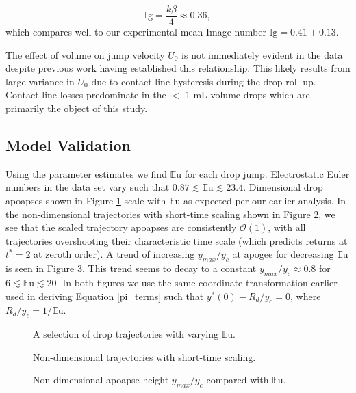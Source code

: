 \documentclass[aip,reprint, floatfix]{revtex4-1}
\begin{document}
\begin{equation*}
\mathbb{I}\mbox{g} = \frac{k \beta}{4} \approx 0.36,
\end{equation*}
which compares well to our experimental mean Image number $\mathbb{I}\mbox{g} = 0.41 \pm 0.13$.

The effect of volume on jump velocity $U_0$ is not immediately evident in the data despite previous work having established this relationship. \cite{attari_puddle_2016} This likely results from large variance in $U_0$ due to contact line hysteresis during the drop roll-up. Contact line losses predominate in the $<$ 1 mL volume drops which are primarily the object of this study.  

\subsection{Model Validation}
Using the parameter estimates we find $\mathbb{E}\mbox{u}$ for each drop jump. Electrostatic Euler numbers in the data set vary such that $0.87 \lesssim \mathbb{E}\mbox{u} \lesssim 23.4$. Dimensional drop apoapses shown in Figure \ref{fig:series_s_eu} scale with $\mathbb{E}\mbox{u}$ as expected per our earlier analysis. In the non-dimensional trajectories with short-time scaling shown in Figure \ref{fig:series_s_ds}, we see that the scaled trajectory apoapses are consistently $\mathcal{O}(1)$, with all trajectories overshooting their characteristic time scale (which predicts returns at $t^*  =2$ at zeroth order). A trend of increasing $y_{max}/y_c$ at apogee for decreasing $\mathbb{E}\mbox{u}$ is seen in Figure \ref{fig:yscale_trend}. This trend seems to decay to a constant $y_{max}/y_c \approx 0.8$ for $6 \lesssim \mathbb{E}\mbox{u} \lesssim 20$. In both figures we use the same coordinate transformation earlier used in deriving Equation \ref{pi_terms} such that $y^*(0) - R_d/y_c = 0$, where $R_d/y_c = 1/\mathbb{E}\mbox{u} $.

\begin{figure}[!htb]
    \centering
    \resizebox{0.5\textwidth}{!}{}
    \caption{A selection of drop trajectories with varying $\mathbb{E}\mbox{u}$.\label{fig:series_s_eu}}
\end{figure}
\begin{figure}[htb]
    \centering
    \resizebox{0.5\textwidth}{!}{}
    \caption{Non-dimensional trajectories with short-time scaling.\label{fig:series_s_ds}}
\end{figure}
\begin{figure}[htb]
    \centering
    \resizebox{0.5\textwidth}{!}{}
    \caption{Non-dimensional apoapse height $y_{max}/y_c$ compared with $\mathbb{E}\mbox{u}$.\label{fig:yscale_trend}}
\end{figure}
\end{document}
